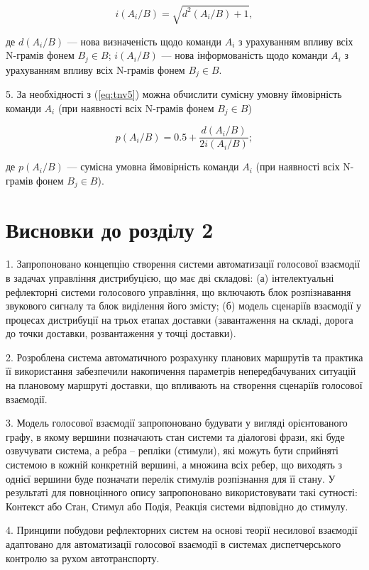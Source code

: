 \[
i(A_i/B) = \sqrt{d^2(A_i/B)+1},
\]

\noindent
де $d(A_i/B)$ --- нова визначеність щодо команди $A_i$ з урахуванням впливу всіх N-грамів фонем $B_j \in B$; $i(A_i/B)$ --- нова інформованість щодо команди $A_i$ з урахуванням впливу всіх N-грамів фонем $B_j \in B$.

5. За необхідності з (\ref{eq:tnv5}) можна обчислити сумісну умовну ймовірність команди $A_i$ (при наявності всіх N-грамів фонем $B_j \in B$)

\[
p(A_i/B)=0.5+\frac{d(A_i/B)}{2i(A_i/B)};
\]

\noindent
де $p(A_i/B)$ --- сумісна умовна ймовірність команди $A_i$ (при наявності всіх N-грамів фонем $B_j \in B$).

\section*{Висновки до розділу 2}

1. Запропоновано концепцію створення системи автоматизації голосової взаємодії в задачах управління дистрибуцією, що має дві складові: (а) інтелектуальні рефлекторні системи голосового управління, що включають блок розпізнавання звукового сигналу та блок виділення його змісту; (б) модель сценаріїв взаємодії у процесах дистрибуції на трьох етапах доставки (завантаження на складі, дорога до точки доставки, розвантаження у точці доставки).

2. Розроблена система автоматичного розрахунку планових маршрутів та практика її використання забезпечили накопичення параметрів непередбачуваних ситуацій на плановому маршруті доставки, що впливають на створення сценаріїв голосової взаємодії.

3. Модель голосової взаємодії запропоновано будувати у вигляді орієнтованого графу, в якому вершини позначають стан системи та діалогові фрази, які буде озвучувати система, а ребра – репліки (стимули), які можуть бути сприйняті системою в кожній конкретній вершині, а множина всіх ребер, що виходять з однієї вершини буде позначати перелік стимулів розпізнання для її стану. У результаті для повноцінного опису запропоновано використовувати такі сутності: Контекст або Стан, Стимул або Подія, Реакція системи відповідно до стимулу.

4. Принципи побудови рефлекторних систем на основі теорії несилової взаємодії адаптовано для автоматизації голосової взаємодії в системах диспетчерського контролю за рухом автотранспорту.
